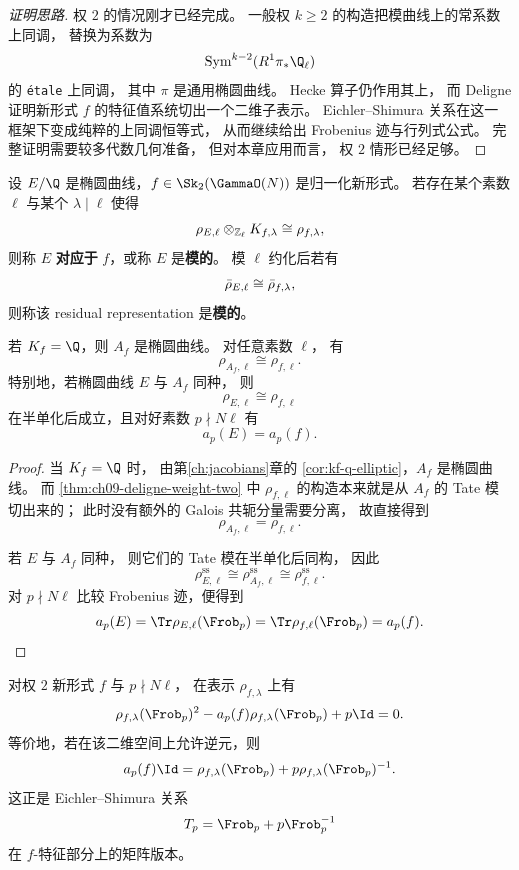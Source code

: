 \begin{proof}[证明思路]
权 $2$ 的情况刚才已经完成。
一般权 $k\ge 2$ 的构造把模曲线上的常系数上同调，
替换为系数为
\[
  \operatorname{Sym}^{k-2}(R^1\pi_*\Q_\ell)
\]
的 \texttt{\'etale} 上同调，
其中 $\pi$ 是通用椭圆曲线。
Hecke 算子仍作用其上，
而 Deligne 证明新形式 $f$ 的特征值系统切出一个二维子表示。
Eichler--Shimura 关系在这一框架下变成纯粹的上同调恒等式，
从而继续给出 Frobenius 迹与行列式公式。
完整证明需要较多代数几何准备，
但对本章应用而言，
权 $2$ 情形已经足够。
\end{proof}

\begin{definition}[模形式性]
设 $E/\Q$ 是椭圆曲线，$f\in \Sk_2(\GammaO(N))$ 是归一化新形式。
若存在某个素数 $\ell$ 与某个 $\lambda\mid \ell$ 使得
\[
  \rho_{E,\ell}\otimes_{\mathbb{Z}_\ell}K_{f,\lambda}
  \cong
  \rho_{f,\lambda},
\]
则称 $E$ \textbf{对应于} $f$，或称 $E$ 是\textbf{模的}。
模 $\ell$ 约化后若有
\[
  \bar{\rho}_{E,\ell}\cong \bar{\rho}_{f,\lambda},
\]
则称该 residual representation 是\textbf{模的}。
\end{definition}

\begin{proposition}[模椭圆曲线的表示与模形式表示一致]
\label{prop:ch09-elliptic-modular-rep-agree}
若 $K_f=\Q$，则 $A_f$ 是椭圆曲线。
对任意素数 $\ell$，
有
\[
  \rho_{A_f,\ell}\cong \rho_{f,\ell}.
\]
特别地，若椭圆曲线 $E$ 与 $A_f$ 同种，
则
\[
  \rho_{E,\ell}\cong \rho_{f,\ell}
\]
在半单化后成立，且对好素数 $p\nmid N\ell$ 有
\[
  a_p(E)=a_p(f).
\]
\end{proposition}

\begin{proof}
当 $K_f=\Q$ 时，
由第\ref{ch:jacobians}章的 \cref{cor:kf-q-elliptic}，$A_f$ 是椭圆曲线。
而 \cref{thm:ch09-deligne-weight-two} 中 $\rho_{f,\ell}$ 的构造本来就是从 $A_f$ 的 Tate 模切出来的；
此时没有额外的 Galois 共轭分量需要分离，
故直接得到
\[
  \rho_{A_f,\ell}=\rho_{f,\ell}.
\]

若 $E$ 与 $A_f$ 同种，
则它们的 Tate 模在半单化后同构，
因此
\[
  \rho_{E,\ell}^{\mathrm{ss}}\cong \rho_{A_f,\ell}^{\mathrm{ss}}\cong \rho_{f,\ell}^{\mathrm{ss}}.
\]
对 $p\nmid N\ell$ 比较 Frobenius 迹，便得到
\[
  a_p(E)=\Tr\rho_{E,\ell}(\Frob_p)=\Tr\rho_{f,\ell}(\Frob_p)=a_p(f).
\]
\end{proof}

\begin{proposition}
\label{prop:ch09-eichler-shimura-rep-form}
对权 $2$ 新形式 $f$ 与 $p\nmid N\ell$，
在表示 $\rho_{f,\lambda}$ 上有
\[
  \rho_{f,\lambda}(\Frob_p)^2-a_p(f)\rho_{f,\lambda}(\Frob_p)+p\Id=0.
\]
等价地，若在该二维空间上允许逆元，则
\[
  a_p(f)\Id=\rho_{f,\lambda}(\Frob_p)+p\rho_{f,\lambda}(\Frob_p)^{-1}.
\]
这正是 Eichler--Shimura 关系
\[
  T_p=\Frob_p+p\Frob_p^{-1}
\]
在 $f$-特征部分上的矩阵版本。
\end{proposition}

